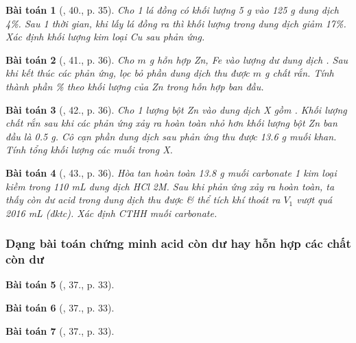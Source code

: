 \documentclass{article}
\newtheorem{baitoan}{Bài toán}
\begin{document}
\begin{baitoan}[\cite{An_350_BT_Hoa_Hoc_9}, 40., p. 35]
	Cho 1 lá đồng có khối lượng \emph{5 g} vào \emph{125 g} dung dịch \emph{ 4\%}. Sau 1 thời gian, khi lấy lá đồng ra thì khối lượng \emph{} trong dung dịch giảm \emph{17\%}. Xác định khối lượng kim loại \emph{Cu} sau phản ứng.
\end{baitoan}

\begin{baitoan}[\cite{An_350_BT_Hoa_Hoc_9}, 41., p. 36]
	Cho $m$ \emph{g} hỗn hợp \emph{Zn, Fe} vào lượng dư dung dịch \emph{}. Sau khi kết thúc các phản ứng, lọc bỏ phần dung dịch thu được $m$ \emph{g} chất rắn. Tính thành phần \% theo khối lượng của \emph{Zn} trong hỗn hợp ban đầu.
\end{baitoan}

\begin{baitoan}[\cite{An_350_BT_Hoa_Hoc_9}, 42., p. 36]
	Cho 1 lượng bột \emph{Zn} vào dung dịch X gồm \emph{}. Khối lượng chất rắn sau khi các phản ứng xảy ra hoàn toàn nhỏ hơn khối lượng bột \emph{Zn} ban đầu là \emph{0.5 g}. Cô cạn phần dung dịch sau phản ứng thu được \emph{13.6 g} muối khan. Tính tổng khối lượng các muối trong X.
\end{baitoan}

\begin{baitoan}[\cite{An_350_BT_Hoa_Hoc_9}, 43., p. 36]
	Hòa tan hoàn toàn \emph{13.8 g} muối carbonate 1 kim loại kiềm \emph{} trong \emph{110 mL} dung dịch \emph{HCl 2M}. Sau khi phản ứng xảy ra hoàn toàn, ta thấy còn dư acid trong dung dịch thu được \& thể tích khí thoát ra $V_1$ vượt quá \emph{2016 mL} (đktc). Xác định CTHH muối carbonate.
\end{baitoan}

\subsubsection{Dạng bài toán chứng minh acid còn dư hay hỗn hợp các chất còn dư}

\begin{baitoan}[\cite{An_350_BT_Hoa_Hoc_9}, 37., p. 33]
	
\end{baitoan}

\begin{baitoan}[\cite{An_350_BT_Hoa_Hoc_9}, 37., p. 33]
	
\end{baitoan}

\begin{baitoan}[\cite{An_350_BT_Hoa_Hoc_9}, 37., p. 33]
	
\end{baitoan}
\end{document}
